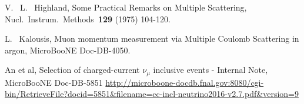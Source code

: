 \begin{thebibliography}{1}
  V. ~L. ~Highland, 
  Some Practical Remarks on Multiple Scattering, 
  Nucl.\ Instrum.\ Methods\ {\bf 129} (1975)
104-120.
  
  L. ~Kalousis, 
  Muon momentum measurement via Multiple Coulomb Scattering in argon,
  MicroBooNE Doc-DB-4050.

An et al,
Selection of charged-current $\nu_\mu$ inclusive events - Internal Note,
MicroBooNE Doc-DB-5851
\url{http://microboone-docdb.fnal.gov:8080/cgi-bin/RetrieveFile?docid=5851&filename=cc-incl-neutrino2016-v2.7.pdf&version=9}

\end{thebibliography}